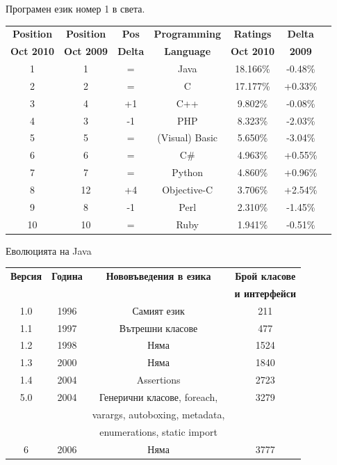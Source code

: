 \documentclass{beamer}
\begin{document}
\begin{frame}{Програмен език номер 1 в света.}
  \transdissolve
  \begin{tabular}{|c|c|c|c|c|c|c|}
    \hline
    \textbf{Position} &
    \textbf{Position} & \textbf{Pos} & \textbf{Programming} &
    \textbf{Ratings} & \textbf{Delta} \\
    \textbf{Oct 2010} &
    \textbf{Oct 2009} & \textbf{Delta} & \textbf{Language} &
    \textbf{Oct 2010} & \textbf{2009} \\ 
    \hline
    \hline
    1 & 1 & = & Java & 18.166\% & -0.48\% \\
    \hline
    2 & 2 & = & C & 17.177\% & +0.33\% \\
    \hline
    3 & 4 & +1 & C++ & 9.802\% & -0.08\% \\
    \hline
    4 & 3 & -1 & PHP & 8.323\% & -2.03\% \\
    \hline
    5 & 5 & = & (Visual) Basic & 5.650\% & -3.04\% \\
    \hline
    6 & 6 & = & C\# & 4.963\% & +0.55\% \\
    \hline
    7 & 7 & = & Python & 4.860\% & +0.96\% \\
    \hline
    8 & 12 & +4 & Objective-C & 3.706\% & +2.54\% \\
    \hline
    9 & 8 & -1 & Perl & 2.310\% & -1.45\% \\
    \hline
    10 & 10 & = & Ruby & 1.941\% & -0.51\% \\
    \hline
  \end{tabular}
\end{frame}

\begin{frame}{Еволюцията на Java}
  \transdissolve
  \begin{tabular}{|c|c|c|c|}
    \hline
    \textbf{Версия} & \textbf{Година} & \textbf{Нововъведения в езика}
    & \textbf{Брой класове} \\
    & & & \textbf{и интерфейси} \\
    \hline
    1.0 & 1996 & Самият език & 211 \\
    \hline
    1.1 & 1997 & Вътрешни класове & 477 \\
    \hline
    1.2 & 1998 & Няма & 1524 \\
    \hline
    1.3 & 2000 & Няма & 1840 \\
    \hline
    1.4 & 2004 & Assertions & 2723 \\
    \hline
    5.0 & 2004 & Генерични класове, foreach, & 3279 \\ 
    & & varargs, autoboxing, metadata, & \\ 
    & & enumerations, static import & \\
    \hline
    6 & 2006 & Няма & 3777 \\
    \hline
  \end{tabular}
\end{frame}
\end{document}
